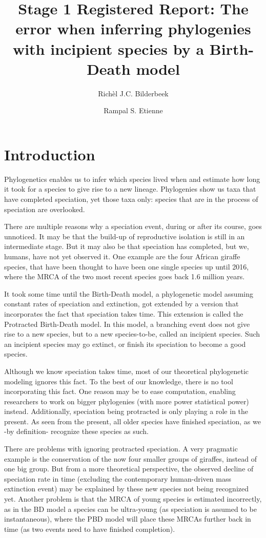 \documentclass{article}
\title{Stage 1 Registered Report: The error when inferring phylogenies with incipient species by a Birth-Death model}
\author[1]{Rich\`el J.C. Bilderbeek}
\author[1]{Rampal S. Etienne}
\affil[1]{Groningen Institute for Evolutionary Life Sciences, University of Groningen, Groningen, The Netherlands}
\begin{document}
\maketitle

\section{Introduction}

Phylogenetics enables us to infer which species lived when and
estimate how long it took for a species to give rise to a new
lineage. Phylogenies show us taxa that have completed speciation, yet
those taxa only: species that are in the process of speciation are 
overlooked.

There are multiple reasons why a speciation event, during
or after its course, goes unnoticed. It may be that the build-up
of reproductive isolation is still in an intermediate stage. But it
may also be that speciation has completed, but we, humans, have not
yet observed it. One example are the four African giraffe species, 
that have been thought to have been one single species up until 2016,
where the MRCA of the two most recent species goes back 1.6 million years.

It took some time until the Birth-Death model, a phylogenetic model
assuming constant rates of speciation and extinction, got extended
by a version that incorporates the fact that speciation takes time.
This extension is called the Protracted Birth-Death model. In this
model, a branching event does not give rise to a new species, but to
a new species-to-be, called an incipient species. Such an incipient
species may go extinct, or finish its speciation to become a good species.

Although we know speciation takes time, most of our theoretical 
phylogenetic modeling ignores this fact. To the best of our knowledge,
there is no tool incorporating this fact. One reason may be to ease
computation, enabling researchers to work on bigger phylogenies (with
more power statistical power) instead. Additionally, speciation being
protracted is only playing a role in the present. As seen from the present,
all older species have finished speciation, as we -by definition- recognize
these species as such. 

There are problems with ignoring protracted speciation. A very pragmatic
example is the conservation of the now four smaller groups of giraffes,
instead of one big group. But from a more theoretical perspective, the
observed decline of speciation rate in time (excluding the contemporary human-driven
mass extinction event) may be explained by these new species not being 
recognized yet. Another problem is that the MRCA of young species is estimated 
incorrectly, as in the BD model a species can be ultra-young (as speciation
is assumed to be instantaneous), where the PBD model will place these MRCAs
further back in time (as two events need to have finished completion).
\end{document}
